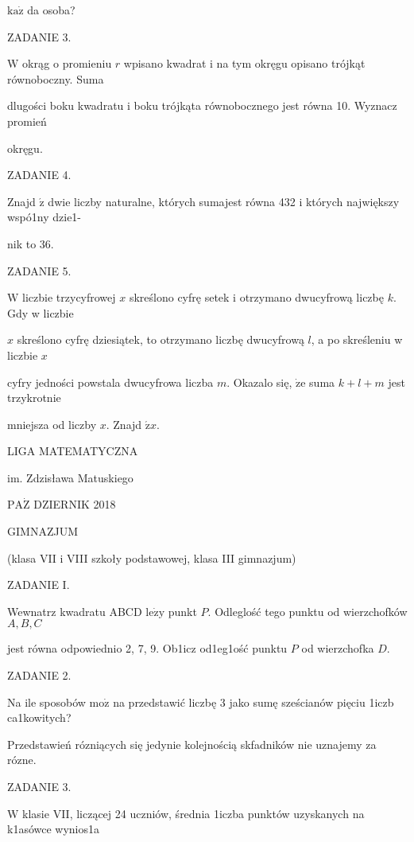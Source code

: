 \documentclass[a4paper,12pt]{article}
\begin{document}
$\mathrm{k}\mathrm{a}\dot{\mathrm{z}}$ da osoba?

ZADANIE 3.

$\mathrm{W}$ okrąg o promieniu $r$ wpisano kwadrat i na tym okręgu opisano trójkąt równoboczny. Suma

dlugości boku kwadratu i boku trójkąta równobocznego jest równa 10. Wyznacz promień

okręgu.

ZADANIE 4.

Znajd $\acute{\mathrm{z}}$ dwie liczby naturalne, których sumajest równa 432 i których największy wspó1ny dzie1-

nik to 36.

ZADANIE 5.

$\mathrm{W}$ liczbie trzycyfrowej $x$ skreślono cyfrę setek i otrzymano dwucyfrową liczbę $k$. Gdy w liczbie

$x$ skreślono cyfrę dziesiątek, to otrzymano liczbę dwucyfrową $l$, a po skreśleniu w liczbie $x$

cyfry jedności powstala dwucyfrowa liczba $m$. Okazalo się, $\dot{\mathrm{z}}\mathrm{e}$ suma $k+l+m$ jest trzykrotnie

mniejsza od liczby $x.$ Znajd $\acute{\mathrm{z}}x.$






LIGA MATEMATYCZNA

im. Zdzisława Matuskiego

$\mathrm{P}\mathrm{A}\dot{\mathrm{Z}}$ DZIERNIK 2018

GIMNAZJUM

(klasa VII i VIII szkoły podstawowej, klasa III gimnazjum)

ZADANIE I.

Wewnatrz kwadratu ABCD $\mathrm{l}\mathrm{e}\dot{\mathrm{z}}\mathrm{y}$ punkt $P$. Odleglość tego punktu od wierzchofków $A, B, C$

jest równa odpowiednio 2, 7, 9. Ob1icz od1eg1ość punktu $P$ od wierzchofka $D.$

ZADANIE 2.

Na ile sposobów $\mathrm{m}\mathrm{o}\dot{\mathrm{z}}$ na przedstawić liczbę 3 jako sumę sześcianów pięciu 1iczb ca1kowitych?

Przedstawień rózniących się jedynie kolejnością skfadników nie uznajemy za rózne.

ZADANIE 3.

$\mathrm{W}$ klasie VII, liczącej 24 uczniów, średnia 1iczba punktów uzyskanych na k1asówce wynios1a
\end{document}

